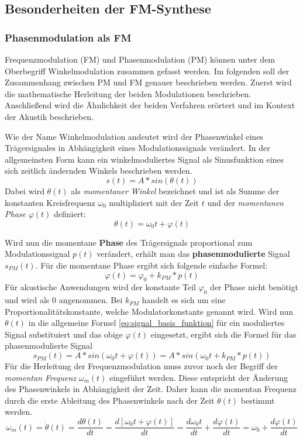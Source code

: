 \subsection{Besonderheiten der FM-Synthese}

\subsubsection{Phasenmodulation als FM}
Frequenzmodulation (FM) und Phasenmodulation (PM) können unter dem Oberbegriff Winkelmodulation zusammen gefasst werden. Im folgenden soll der Zusammenhang zwischen PM und FM genauer beschrieben werden. Zuerst wird die mathematische Herleitung der beiden Modulationen beschrieben. Anschließend wird die Ähnlichkeit der beiden Verfahren erörtert und im Kontext der Akustik beschrieben.

Wie der Name Winkelmodulation andeutet wird der Phasenwinkel eines Trägersignales in Abhängigkeit eines Modulationssignals verändert. In der allgemeinsten Form kann ein winkelmoduliertes Signal als Sinusfunktion eines sich zeitlich ändernden Winkels beschrieben werden.
\begin{equation}
s(t)=A*sin(\theta(t))
\label{eq:signal_basis_funktion}
\end{equation}
Dabei wird \(\theta(t)\) als \textit{momentaner Winkel} bezeichnet und ist als Summe der konstanten Kreisfrequenz $\omega_0$ multipliziert mit der Zeit $t$ und der \textit{momentanen Phase} $\varphi(t)$ definiert:
\begin{equation*}
\theta(t)=\omega_0t + \varphi(t)
\end{equation*}

Wird nun die momentane \textbf{Phase} des Trägersignals proportional zum Modulationssignal \(p(t)\) verändert, erhält man das \textbf{phasenmodulierte} Signal \(s_{PM}(t)\).
Für die momentane Phase ergibt sich folgende einfache Formel:
\[
\varphi(t)=\varphi_0+k_{PM}*p(t)
\]
Für akustische Anwendungen wird der konstante Teil \(\varphi_0\) der Phase nicht benötigt und wird als 0 angenommen. Bei \(k_{PM}\) handelt es sich um eine Proportionalitätskonstante, welche Modulatorkonstante genannt wird. Wird nun \(\theta(t)\) in die allgemeine Formel \ref{eq:signal_basis_funktion} für ein moduliertes Signal substituiert und das obige \(\varphi(t)\) eingesetzt, ergibt sich die Formel für das phasenmodulierte Signal
\begin{equation}
s_{PM}(t)=A*sin(\omega_0t + \varphi(t))=A*sin(\omega_0t+k_{PM}*p(t))
\label{eq:s_pm}
\end{equation}
Für die Herleitung der Frequenzmodulation muss zuvor noch der Begriff der \textit{momentan Frequenz} \(\omega_m(t)\) eingeführt werden.
Diese entspricht der Änderung des Phasenwinkels in Abhängigkeit der Zeit. Daher kann die momentan Frequenz durch die erste Ableitung des Phasenwinkels nach der Zeit $\dot \theta(t)$ bestimmt werden.
\begin{equation}
\omega_m(t)=\dot \theta(t)=\frac{d\theta(t)}{dt}=\frac{d[\omega_0t+\varphi(t)]}{dt}=\frac{d\omega_0t}{dt}+\frac{d\varphi(t)}{dt}=\omega_0+\frac{d\varphi(t)}{dt}
\label{eq:omega_m_herleitung}
\end{equation}


